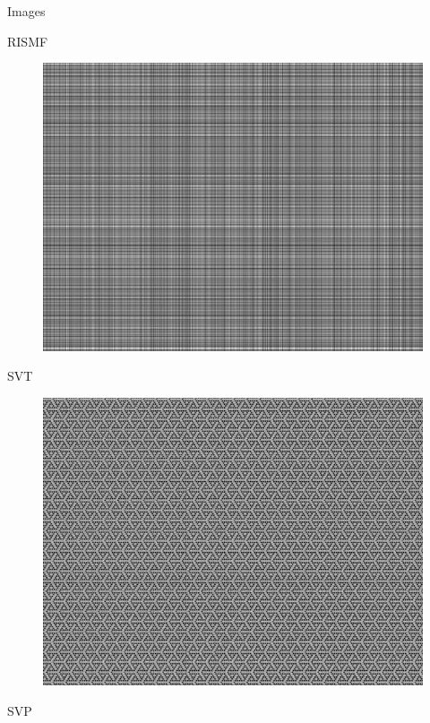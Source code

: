 \documentclass{beamer}
\begin{document}
\begin{frame}{Images}
	\vspace{-0.2cm}
	\begin{multicols}{3}
		\vspace{-0.2cm}
		\hspace{0.5cm}RISMF
		\vspace{-0.2cm}
		\begin{figure}[h]
			\centering
			\includegraphics[width=0.8\linewidth]{./../data/images/presentation/p1_3_20_01_RISMF_RMSE_037643.jpg}
		\end{figure}
		\vspace{-0.2cm}
		\hspace{0.5cm}SVT
		\vspace{-0.2cm}
		\begin{figure}[h]
			\centering
			\includegraphics[width=0.8\linewidth]{./../data/images/presentation/p1_3_20_01_SVT_RMSE_007624.jpg}
		\end{figure}
		\vspace{-0.2cm}
		\hspace{0.5cm}SVP
		\vspace{-0.2cm}

\end{multicols}
\end{frame}
\end{document}

